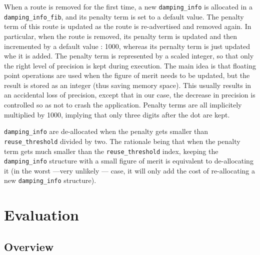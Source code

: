 \documentclass[a4paper,english]{IEEEtran}
\begin{document}
When a route is removed for the first time, a new {\tt\small damping\_info} 
is allocated in a {\tt\small damping\_info\_fib}, and its penalty term is set to 
a default value. The penalty term of this route is updated as the route is re-advertised
and removed again. In particular, when the route is removed, its penalty term is
updated and then incremented by a default value : 1000, whereas its pernalty term is just
updated whe it is added. The penalty term is represented by a scaled integer,
so that only the right level of precision is kept during execution.
The main idea is that floating point operations are used when the figure of merit needs
to be updated, but the result is stored as an integer (thus saving memory space).
This usually results in an accidental loss of precision, except that in our case,
the decrease in precision is controlled so as not to crash the application. 
Penalty terms are all implicitely multiplied by 1000, implying that only three digits 
after the dot are kept.

{\tt\small damping\_info} are de-allocated when the penalty gets smaller than
{\tt\small reuse\_threshold} divided by two. The rationale being that when the penalty
term gets much smaller than the {\tt\small reuse\_threshold} index, keeping the 
{\tt\small damping\_info} structure with a small figure of merit is equivalent to de-allocating it 
(in the worst ---very unlikely --- case, it will only add the cost of re-allocating a 
new {\tt\small damping\_info} structure).

\section{Evaluation}

\subsection{Overview}
\end{document}
